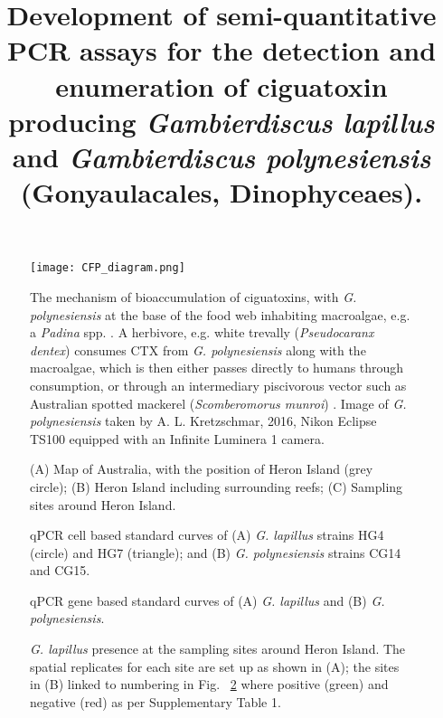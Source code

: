 \documentclass[12pt]{article}
\title{Development of semi-quantitative PCR assays for the detection and enumeration of ciguatoxin producing \emph{Gambierdiscus lapillus} and \emph{Gambierdiscus polynesiensis} (Gonyaulacales, Dinophyceaes).}
\author{}
\date{}
\begin{document}
\maketitle

\begin{figure} 
\texttt{[image: CFP\_diagram.png]} 
\caption{The mechanism of bioaccumulation of ciguatoxins, with \emph{G. polynesiensis} at the base of the food web inhabiting macroalgae, e.g. a \emph{Padina} spp. \cite{padina}. A herbivore, e.g. white trevally (\emph{Pseudocaranx dentex}) \cite{trevally} consumes CTX from \emph{G. polynesiensis} along with the macroalgae, which is then either passes directly to humans through consumption, or through an intermediary piscivorous vector such as Australian spotted mackerel (\emph{Scomberomorus munroi}) \cite{mackerel}. Image of \emph{G. polynesiensis} taken by A. L. Kretzschmar, 2016, Nikon Eclipse TS100 equipped with an Infinite Luminera 1 camera.} 
\label{fig:bioacc}
\end{figure} 
\FloatBarrier

\begin{figure} 
\caption{(A) Map of Australia, with the position of Heron Island (grey circle); (B) Heron Island including surrounding reefs; (C) Sampling sites around Heron Island.} 
\label{fig:samplesites}
\end{figure} 
\FloatBarrier

\begin{figure}
\caption{qPCR cell based standard curves of (A) \emph{G. lapillus} strains HG4 (circle) and HG7 (triangle); and (B) \emph{G. polynesiensis} strains CG14 and CG15.} %
\label{fig:stdCurve}
\end{figure}
\FloatBarrier

\begin{figure}
\caption{qPCR gene based standard curves of (A) \emph{G. lapillus} and (B) \emph{G. polynesiensis}.} %
\label{fig:lapigblocks}
\end{figure}
\FloatBarrier

\FloatBarrier 
\begin{figure} 
\caption{\emph{G. lapillus} presence at the sampling sites around Heron Island. The spatial replicates for each site are set up as shown in (A); the sites in (B) linked to numbering in Fig. ~\ref{fig:samplesites} where positive (green) and negative (red) as per Supplementary Table 1.} 
\label{fig:envposneg}
\end{figure} 
\FloatBarrier
\end{document}

